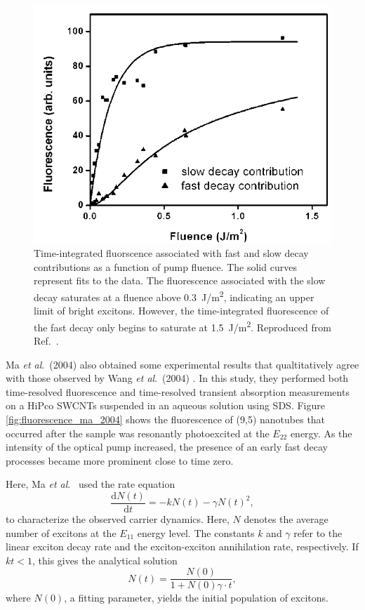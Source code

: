 \begin{figure}[H]
	\centering
	\includegraphics[scale=0.3]{images/chapter_prior_works/fast_slow_wang_2004}
	\caption{Time-integrated fluorscence associated with fast and slow decay contributions as a function of pump fluence. The solid curves represent fits to the data. The fluorescence associated with the slow decay saturates at a fluence above \SI{0.3}{\joule / \meter \squared}, indicating an upper limit of bright excitons. However, the time-integrated fluorescence of the fast decay only begins to saturate at \SI{1.5}{\joule / \meter \squared}. Reproduced from Ref.\ \cite{wang2004observation}.}
	\label{fig:fast_slow_wang_2004}
\end{figure}



Ma \textit{et al}.\ (2004) \cite{ma2004ultrafast} also obtained some experimental results that qualtitatively agree with those observed by Wang \textit{et al}.\ (2004) \cite{wang2004observation}. In this study, they performed both time-resolved fluorescence and time-resolved transient absorption measurements on a HiPco SWCNTs suspended in an aqueous solution using SDS. Figure \ref{fig:fluorescence_ma_2004} shows the fluorescence of (9,5) nanotubes that occurred after the sample was resonantly photoexcited at the $E_{22}$ energy. As the intensity of the optical pump increased, the presence of an early fast decay processes became more prominent close to time zero.

Here, Ma \textit{et al}.\ \cite{ma2004ultrafast} used the rate equation
\begin{equation}
	\dfrac{\mathrm{d}N(t)}{\mathrm{d}t} = - k N(t) - \gamma N(t)^2,
\end{equation}
to characterize the observed carrier dynamics. Here, $N$ denotes the average number of excitons at the $E_{11}$ energy level. The constants $k$ and $\gamma$ refer to the linear exciton decay rate and the exciton-exciton annihilation rate, respectively. If $kt < 1$, this gives the analytical solution
\begin{equation}
	N(t) = \dfrac{N(0)}{1 + N(0)\gamma \cdot t},
\end{equation}
where $N(0)$, a fitting parameter, yields the initial population of excitons.

